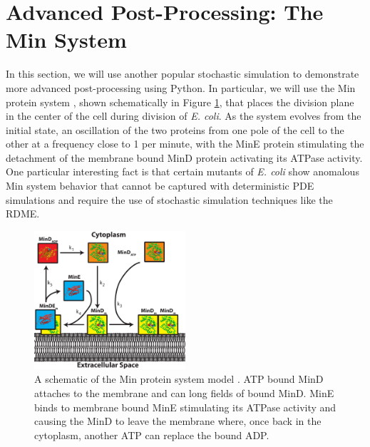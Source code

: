 

\section{Advanced Post-Processing: The Min System}

In this section, we will use another popular stochastic simulation to demonstrate more advanced post-processing using Python.  In particular, we will use the Min protein system \cite{Loose2011pso,Fange2006nim}, shown schematically in Figure \ref{fig:minsystem}, that places the division plane in the center of the cell during division of {\it E. coli}.  As the system evolves from the initial state, an oscillation of the two proteins from one pole of the cell to the other at a frequency close to 1 per minute, with the MinE protein stimulating the detachment of the membrane bound MinD protein activating its ATPase activity.  One particular interesting fact is that certain mutants of {\it E. coli} show anomalous Min system behavior that cannot be captured with deterministic PDE simulations and require the use of stochastic simulation techniques like the RDME.

\begin{figure}[h!]
  \centering
        \includegraphics[width=0.5\textwidth]{Figures/MinDESystem.pdf}
        \caption{A schematic of the Min protein system model \cite{Peterson2013}.  ATP bound MinD attaches to the membrane and can long fields of bound MinD.  MinE binds to membrane bound MinE stimulating its ATPase activity and causing the MinD to leave the membrane where, once back in the cytoplasm, another ATP can replace the bound ADP.} \label{fig:minsystem}
\end{figure}


